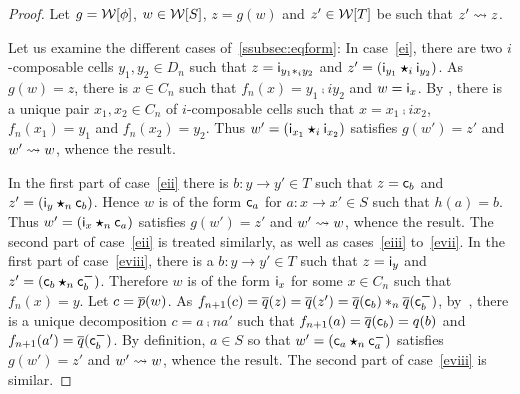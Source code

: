 \begin{proof}
  Let $g=\mathcal{W}[\phi]$, $w\in\mathcal{W}[S]$, $z=g(w)$ and $z'\in\mathcal{W}[T]$ be such that
  $z'\leadsto z$.

  Let us examine the different cases of~\ref{ssubsec:eqform}: In
  case~\ref{ei}, there are two $i$-composable cells $y_1,y_2\in D_n$ such that
  $z=\mathsf{i}_{y_1\ast_{i} y_2}$ and $z'=(\mathsf{i}_{y_1}\bm{\star}_{i} \mathsf{i}_{y_2})$. As
  $g(w)=z$, there is $x\in C_n$ such that $f_n(x)=y_1\comp i y_2$ and
  $w=\mathsf{i}_{x}$. By \cndii, there is a unique pair
  $x_1,x_2\in C_n$ of $i$-composable cells such that $x=x_1\comp i
  x_2$, $f_n(x_1)=y_1$ and $f_n(x_2)=y_2$. Thus $w'=(\mathsf{i}_{x_1}\bm{\star}_{i}\mathsf{i}_{x_2})$ satisfies $g(w')=z'$ and $w'\leadsto w$, whence the
  result.

  In the first part of case~\ref{eii}  there is $b:y\to y'\in T$ such that
  $z=\mathsf{c}_{b}$ and $z'=(\mathsf{i}_{y}\bm{\star}_{n}
\mathsf{c}_{b})$. Hence $w$ is of the form $\mathsf{c}_{a}$ for
$a:x\to x'\in S$ such that $h(a)=b$. Thus $w'=(\mathsf{i}_{x}\bm{\star}_{n} \mathsf{c}_{a})$ satisfies $g(w')=z'$ and $w'\leadsto w$, whence the result.
The second part of case~\ref{eii} is treated similarly, as well as
cases~\ref{eiii} to~\ref{evii}.
In the first part of
   case~\ref{eviii}, there is a $b:y\to y'\in T$ such that $z=\mathsf{i}_{y}$ and $z'=(\mathsf{c}_{b}\bm{\star}_{n}\mathsf{c}^{\boldsymbol{-}}_{b})$. Therefore $w$ is of the form $\mathsf{i}_{x}$ for some $x\in
   C_n$ such that $f_n(x)=y$. Let $c=\overline{p}(w)$. As
   $f_{n+1}(c)=\overline{q}(z)=\overline{q}(z')=\overline{q}(\mathsf{c}_{b})\ast_{n}
   \overline{q}(\mathsf{c}^{\boldsymbol{-}}_{b})$, by~\cndii, there is a unique
   decomposition $c=a\comp n a'$ such that $f_{n+1}(a)=\overline{q}(\mathsf{c}_{b})=q(b)$ and $f_{n+1}(a')=\overline{q}(\mathsf{c}^{\boldsymbol{-}}_{b})$. By
   definition, $a\in S$ so that $w'=(\mathsf{c}_{a}\bm{\star}_{n}\mathsf{c}^{\boldsymbol{-}}_{a})$ satisfies
   $g(w')=z'$ and $w'\leadsto w$, whence the result. The second part of
   case~\ref{eviii} is similar.
 \end{proof}


